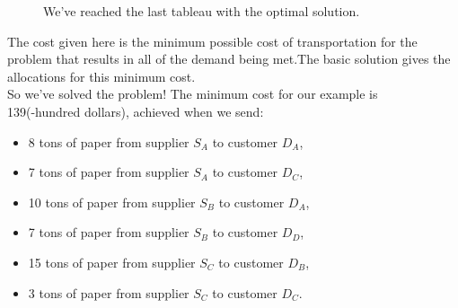 \documentclass[a4paper,12pt]{article}
\begin{document}
\begin{enumerate}
\begin{figure}[h!]
\centering
{}
\caption{We've reached the last tableau with the optimal solution.}
\end{figure}

The cost given here is the minimum possible cost of transportation for the problem that results in all of the demand being met.The basic solution gives the allocations for this minimum cost.\\

So we've solved the problem! The minimum cost for our example is\\ 139(-hundred dollars), achieved when we send:
\begin{itemize}
\item 8 \;\;tons of paper from supplier $S_A$ to customer $D_A$,
\item 7 \;\;tons of paper from supplier $S_A$ to customer $D_C$,
\item 10 tons of paper from supplier $S_B$ to customer $D_A$,
\item 7 \;\;tons of paper from supplier $S_B$ to customer $D_D$,
\item 15 tons of paper from supplier $S_C$ to customer $D_B$,
\item 3 \;\;tons of paper from supplier $S_C$ to customer $D_C$.
\end{itemize}

\end{enumerate}
\end{document}
